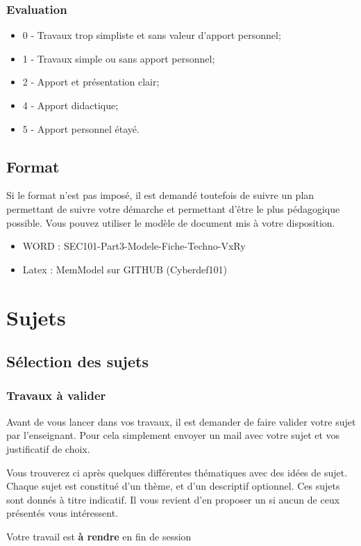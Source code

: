 \begin{frame}
\frametitle<presentation>{Evaluation}

\begin{itemize}
  \item 0 - Travaux trop simpliste et sans valeur d'apport personnel;
  \item 1 - Travaux simple ou sans apport personnel;
  \item 2 - Apport et présentation clair;
  \item 4 - Apport didactique;
  \item 5 - Apport personnel étayé.
\end{itemize}
\end{frame}

\subsection{Format}

Si le format n'est pas imposé, il est demandé toutefois de suivre un plan permettant de suivre votre démarche et permettant d'être le plus pédagogique possible.
Vous pouvez utiliser le modèle de document mis à votre disposition.

\begin{itemize}
  \item WORD : SEC101-Part3-Modele-Fiche-Techno-VxRy
  \item Latex :  MemModel sur GITHUB (Cyberdef101)
\end{itemize}

\section{Sujets}

\subsection{Sélection des sujets}

\begin{frame}
\frametitle<presentation>{Travaux à valider}
Avant de vous lancer dans vos travaux, il est demander de faire valider votre sujet par l'enseignant. Pour cela simplement envoyer un mail avec votre sujet et vos justificatif de choix.

Vous trouverez ci après quelques différentes thématiques avec des idées de sujet. Chaque sujet est constitué d'un thème, et d'un descriptif optionnel.
Ces sujets sont donnés à titre indicatif. Il vous revient d'en proposer un si aucun de ceux présentés vous intéressent.

Votre travail est \textbf{à rendre} en fin de session

\end{frame}

